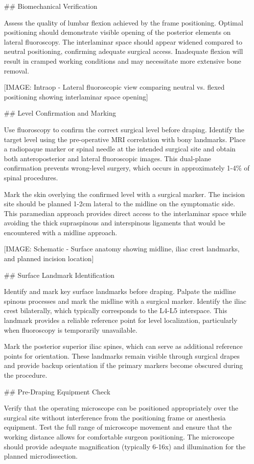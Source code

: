 \documentclass[12pt,a4paper]{article}
\begin{document}
\#\# Biomechanical Verification

Assess the quality of lumbar flexion achieved by the frame positioning. Optimal positioning should demonstrate visible opening of the posterior elements on lateral fluoroscopy. The interlaminar space should appear widened compared to neutral positioning, confirming adequate surgical access. Inadequate flexion will result in cramped working conditions and may necessitate more extensive bone removal.

[IMAGE: Intraop - Lateral fluoroscopic view comparing neutral vs. flexed positioning showing interlaminar space opening]

\#\# Level Confirmation and Marking

Use fluoroscopy to confirm the correct surgical level before draping. Identify the target level using the pre-operative MRI correlation with bony landmarks. Place a radiopaque marker or spinal needle at the intended surgical site and obtain both anteroposterior and lateral fluoroscopic images. This dual-plane confirmation prevents wrong-level surgery, which occurs in approximately 1-4\% of spinal procedures.

Mark the skin overlying the confirmed level with a surgical marker. The incision site should be planned 1-2cm lateral to the midline on the symptomatic side. This paramedian approach provides direct access to the interlaminar space while avoiding the thick supraspinous and interspinous ligaments that would be encountered with a midline approach.

[IMAGE: Schematic - Surface anatomy showing midline, iliac crest landmarks, and planned incision location]

\#\# Surface Landmark Identification

Identify and mark key surface landmarks before draping. Palpate the midline spinous processes and mark the midline with a surgical marker. Identify the iliac crest bilaterally, which typically corresponds to the L4-L5 interspace. This landmark provides a reliable reference point for level localization, particularly when fluoroscopy is temporarily unavailable.

Mark the posterior superior iliac spines, which can serve as additional reference points for orientation. These landmarks remain visible through surgical drapes and provide backup orientation if the primary markers become obscured during the procedure.

\#\# Pre-Draping Equipment Check

Verify that the operating microscope can be positioned appropriately over the surgical site without interference from the positioning frame or anesthesia equipment. Test the full range of microscope movement and ensure that the working distance allows for comfortable surgeon positioning. The microscope should provide adequate magnification (typically 6-16x) and illumination for the planned microdissection.
\end{document}
